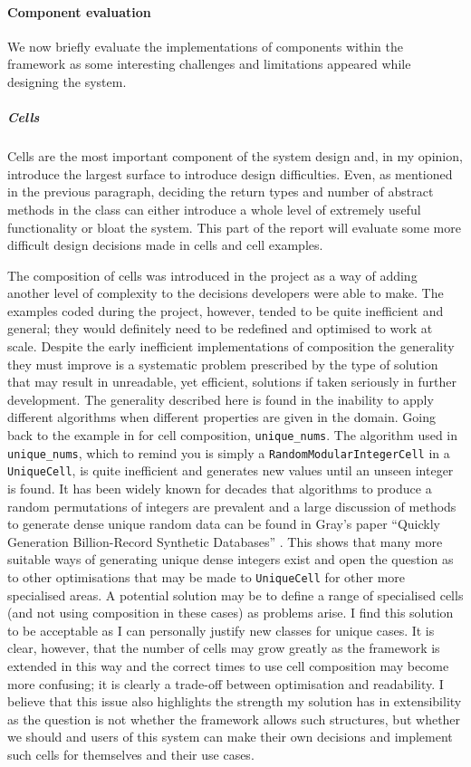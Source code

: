 \paragraph{Component evaluation} We now briefly evaluate the implementations of
components within the framework as some interesting challenges and limitations
appeared while designing the system.

\subparagraph{Cells} Cells are the most important component of the system design
and, in my opinion, introduce the largest surface to introduce design difficulties.
Even, as mentioned in the previous paragraph, deciding the return types and
number of abstract methods in the class can either introduce a whole level of
extremely useful functionality or bloat the system. This part of the report will
evaluate some more difficult design decisions made in cells and cell examples.

The composition of cells was introduced in the project as a way of adding another
level of complexity to the decisions developers were able to make. The examples
coded during the project, however, tended to be quite inefficient and general;
they would definitely need to be redefined and optimised to work at scale.
Despite the early inefficient implementations of composition the generality they
must improve is a systematic problem prescribed by the type of solution that may result in unreadable, yet
efficient, solutions if taken seriously in further development. The
generality described here is found in the inability to apply different
algorithms when different properties are given in the domain. Going back to the
example in  for cell composition,
\lstinline{unique_nums}. The algorithm used in \lstinline{unique_nums}, which
to remind you is simply a \lstinline{RandomModularIntegerCell} in a
\lstinline{UniqueCell}, is quite inefficient and generates new values until an unseen
integer is found. It has been widely known for decades that algorithms to
produce a random permutations of integers are prevalent and a large discussion
of methods to generate dense
unique random data can be found in Gray's paper ``Quickly Generation
Billion-Record Synthetic Databases'' \cite{GenLargeSynthDB}. This shows that
many more suitable ways of generating unique dense integers exist and open the
question as to other optimisations that may be made to \lstinline{UniqueCell}
for other more specialised areas. A potential solution may be to define a range
of specialised cells (and not using composition in these cases) as problems
arise. I find this solution to be acceptable as I can personally justify new
classes for unique cases. It is clear, however, that the number of cells may
grow greatly as the framework is extended in this way and the correct times to
use cell composition may become more confusing; it is
clearly a trade-off between optimisation and readability. I believe that this
issue also highlights the strength my solution has in extensibility as the
question is not whether the framework allows such structures, but whether we
should and users of this system can make their own decisions and implement such
cells for themselves and their use cases.
